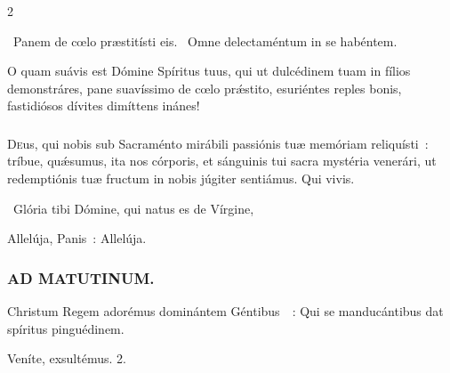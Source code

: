 \documentclass[9pt,twoside]{extarticle}
\begin{document}
\begin{multicols}{2}
{\begin{tightlist}{}
\item {}~Panem de cœlo præstitísti eis. ~Omne delectaméntum in se habéntem.
\item {} O quam suávis est Dómine Spíritus tuus, qui ut dulcédinem tuam in fílios demonstráres, pane suavíssimo de cœlo prǽstito, esuriéntes reples bonis, fastidiósos dívites dimíttens inánes!
\end{tightlist}
\subsubsection*{\center {}}
\lettrine{D}eus, qui nobis sub Sacraménto mirábili passiónis tuæ memóriam reliquísti~: tríbue, quǽsumus, ita nos córporis, et sánguinis tui sacra mystéria venerári, ut redemptiónis tuæ fructum in nobis júgiter sentiámus. Qui vivis.

\begin{tightlist}{}
\item {}~Glória tibi Dómine, qui natus es de Vírgine, 
\item {} Allelúja, Panis~:  Allelúja.
\end{tightlist}

\subsubsection*{\center \textsc{AD MATUTINUM.}}
\begin{tightlist}{}
\item {} Christum Regem adorémus dominántem Géntibus~~: \textred{*} Qui se manducántibus dat spíritus pinguédinem.
\item {} Veníte, exsultémus. 2.
\end{tightlist}

}
\end{multicols}
\end{document}
